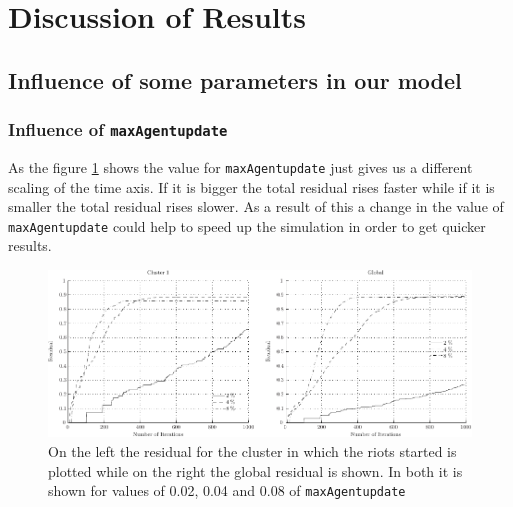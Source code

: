 \section{Discussion of Results}
\label{sec:discussionofresults}

\subsection{Influence of some parameters in our model}

\subsubsection{Influence of \texttt{maxAgentupdate}}
\label{sec:maxAgentUpdate}
As the figure \ref{influencemaxAgentUpdate} shows the value for \texttt{maxAgentupdate} just gives us a different scaling of the time axis. If it is bigger the total residual rises faster while if it is smaller the total residual rises slower. As a result of this a change in the value of \texttt{maxAgentupdate} could help to speed up the simulation in order to get quicker results.

\begin{figure}
\centering
\includegraphics[width= \textwidth]{influenceOfmaxUpdate/influenceMaxAgentUpdate.pdf}
\caption{On the left the residual for the cluster in which the riots started is plotted while on the right the global residual is shown. In both it is shown for values of 0.02, 0.04 and 0.08 of \texttt{maxAgentupdate}}
\label{influencemaxAgentUpdate}
\end{figure}


